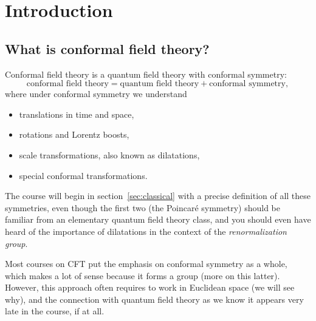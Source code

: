 \documentclass[a4paper,12pt]{article}
\numberwithin{equation}{section}
\begin{document}

\newpage
\section{Introduction}


\subsection{What is conformal field theory?}

Conformal field theory is a quantum field theory with conformal symmetry:
\begin{equation}
	\text{conformal field theory}
	= \text{quantum field theory} + \text{conformal symmetry},
\end{equation}
where under conformal symmetry we understand
\begin{itemize}

\item
translations in time and space,

\item
rotations and Lorentz boosts,

\item
scale transformations, also known as dilatations,

\item
special conformal transformations.

\end{itemize}
The course will begin in section~\ref{sec:classical} with a precise definition of all these symmetries, even though the first two (the Poincaré symmetry) should be familiar from an elementary quantum field theory class, and you should even have heard of the importance of dilatations in the context of the \emph{renormalization group}.

Most courses on CFT put the emphasis on conformal symmetry as a whole, which makes a lot of sense because it forms a group (more on this latter). However, this approach often requires to work in Euclidean space (we will see why), and the connection with quantum field theory as we know it appears very late in the course, if at all.
\end{document}
